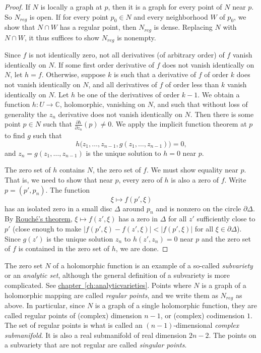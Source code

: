 \documentclass[12pt,openany]{book}
\newcommand{\sabs}[1]{\lvert {#1} \rvert}
\newcommand{\C}{{\mathbb{C}}}
\newcommand{\myindex}[1]{#1\index{#1}}
\theoremstyle{plain}
\theoremstyle{remark}
\theoremstyle{definition}
\theoremstyle{exercise}
\theoremstyle{example}
\newcommand{\chapterref}[1]{\hyperref[#1]{chapter~\ref*{#1}}}
\begin{document}
\begin{proof}
If $N$ is locally a graph at $p$, then it is a graph
for every point of $N$ near $p$.  So $N_{\mathit{reg}}$
is open.
If for every point $p_0 \in N$
and every neighborhood $W$ of $p_0$, we show that
$N \cap W$ has a regular point, then $N_{\mathit{reg}}$ is dense.
Replacing $N$ with $N \cap W$, it thus suffices to show
$N_{\mathit{reg}}$ is nonempty.

Since $f$ is not identically zero, not all derivatives (of arbitrary
order) of $f$
vanish identically on $N$.
If some first order derivative of $f$ does not vanish identically on $N$,
let $h=f$.
Otherwise, suppose $k$ is such that a derivative of $f$ of order $k$
does not vanish identically on $N$, and
all derivatives of $f$ of order less than $k$ vanish identically on
$N$.  Let $h$ be one of the derivatives of order $k-1$.
We obtain a function $h \colon U \to \C$, holomorphic, vanishing on $N$,
and such that
without loss of generality the $z_n$ derivative does not vanish identically
on $N$.  Then there is some point $p \in N$ such that $\frac{\partial
h}{\partial z_n}(p) \neq 0$.
We apply the implicit function theorem at $p$ to find $g$ such that
\begin{equation*}
h\bigl(z_1,\ldots,z_{n-1},g(z_1,\ldots,z_{n-1})\bigr) = 0 ,
\end{equation*}
and $z_n = g(z_1,\ldots,z_{n-1})$ is the unique solution to
$h=0$ near $p$.

The zero set of $h$ contains $N$, the zero set of $f$.
We must show equality near $p$.  That is, we need to show that
near $p$, every zero of $h$ is also a zero of $f$.
Write $p = (p',p_n)$.  The function
\begin{equation*}
\xi \mapsto f(p',\xi)
\end{equation*}
has an isolated zero in a small disc $\Delta$ around $p_n$ and is
nonzero on the circle $\partial \Delta$.  By
\hyperref[thm:onevarrouche]{Rouch\'e's theorem},
$\xi \mapsto f(z',\xi)$ has a zero in $\Delta$
for all $z'$ sufficiently close to $p'$
(close enough to make $\sabs{f(p',\xi)-f(z',\xi)} < \sabs{f(p',\xi)}$ for all $\xi \in
\partial \Delta$).
Since $g(z')$ is the unique solution $z_n$ to $h(z',z_n) = 0$
near $p$ and the
zero set of $f$ is contained in the zero set of $h$, we are done.
\end{proof}

The zero set $N$ of a holomorphic function is an example of a so-called
\emph{\myindex{subvariety}}
or an \emph{\myindex{analytic set}},
although the general definition of a
subvariety is more complicated.
See \chapterref{ch:analyticvarieties}.
Points where $N$ is a graph of a holomorphic mapping are called
\emph{regular points}, and we write them as
$N_{\mathit{reg}}$ as above.  In particular,
since $N$ is a graph of a single holomorphic function, they are called
regular points of (complex) dimension $n-1$, or (complex) codimension $1$.
The set of regular points is what is called an
$(n-1)$-dimensional \emph{\myindex{complex submanifold}}.
It is also a real
submanifold of real dimension $2n-2$.
The points on a subvariety that are not regular are called
\emph{singular points}.
\end{document}
